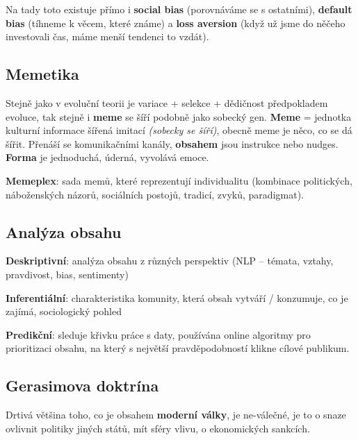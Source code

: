 \vspace{4pt}
\noindent Na tady toto existuje přímo i \textbf{social bias} (porovnáváme se s ostatními), \textbf{default bias} (tíhneme k věcem, které známe) a \textbf{loss aversion} (když už jsme do něčeho investovali čas, máme menší tendenci to vzdát).

\subsection{Memetika}

Stejně jako v evoluční teorii je variace + selekce + dědičnost předpokladem evoluce, tak stejně i \textbf{meme} se šíří podobně jako sobecký gen. \textbf{Meme} = jednotka kulturní informace šířená imitací \textit{(sobecky se šíří)}, obecně meme je něco, co se dá šířit. Přenáší se komunikačními kanály, \textbf{obsahem} jsou instrukce nebo nudges. \textbf{Forma} je jednoduchá, úderná, vyvolává emoce.

\vspace{4pt}
\noindent \textbf{Memeplex}: sada memů, které reprezentují individualitu (kombinace politických, náboženských názorů, sociálních postojů, tradicí, zvyků, paradigmat).

\subsection{Analýza obsahu}

\vspace{4pt}
\noindent \textbf{Deskriptivní}: analýza obsahu z různých perspektiv (NLP -- témata, vztahy, pravdivost, bias, sentimenty)

\vspace{4pt}
\noindent \textbf{Inferentiální}: charakteristika komunity, která obsah vytváří / konzumuje, co je zajímá, sociologický pohled

\vspace{4pt}
\noindent \textbf{Predikční}: sleduje křivku práce s daty, používána online algoritmy pro prioritizaci obsahu, na který s největší pravděpodobností klikne cílové publikum.

\subsection{Gerasimova doktrína}

Drtivá většina toho, co je obsahem \textbf{moderní války}, je ne-válečné, je to o snaze ovlivnit politiky jiných států, mít sféry vlivu, o ekonomických sankcích.

